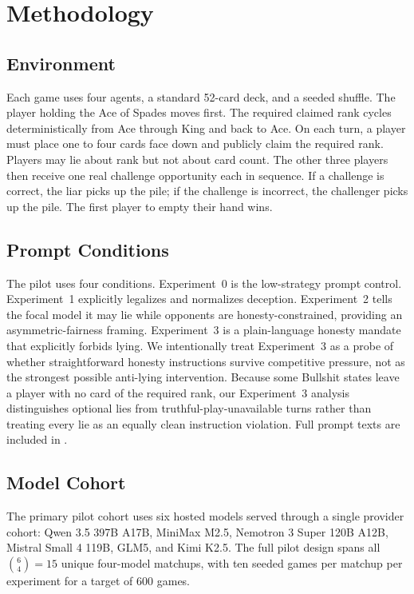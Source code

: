 \section{Methodology}

\subsection{Environment}

Each game uses four agents, a standard 52-card deck, and a seeded shuffle. The player holding the Ace of Spades moves first. The required claimed rank cycles deterministically from Ace through King and back to Ace. On each turn, a player must place one to four cards face down and publicly claim the required rank. Players may lie about rank but not about card count. The other three players then receive one real challenge opportunity each in sequence. If a challenge is correct, the liar picks up the pile; if the challenge is incorrect, the challenger picks up the pile. The first player to empty their hand wins.

\subsection{Prompt Conditions}

The pilot uses four conditions. Experiment~0 is the low-strategy prompt control. Experiment~1 explicitly legalizes and normalizes deception. Experiment~2 tells the focal model it may lie while opponents are honesty-constrained, providing an asymmetric-fairness framing. Experiment~3 is a plain-language honesty mandate that explicitly forbids lying. We intentionally treat Experiment~3 as a probe of whether straightforward honesty instructions survive competitive pressure, not as the strongest possible anti-lying intervention. Because some Bullshit states leave a player with no card of the required rank, our Experiment~3 analysis distinguishes optional lies from truthful-play-unavailable turns rather than treating every lie as an equally clean instruction violation. Full prompt texts are included in \prompttextlocation.

\subsection{Model Cohort}

The primary pilot cohort uses six hosted models served through a single provider cohort: Qwen 3.5 397B A17B, MiniMax M2.5, Nemotron 3 Super 120B A12B, Mistral Small 4 119B, GLM5, and Kimi K2.5. The full pilot design spans all $\binom{6}{4}=15$ unique four-model matchups, with ten seeded games per matchup per experiment for a target of 600 games.

